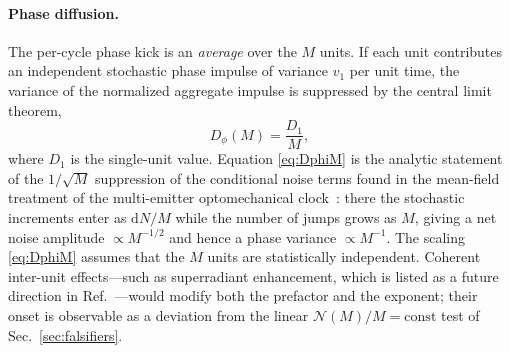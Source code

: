 \documentclass[aps,pre,reprint,amsmath,amssymb,floatfix,nofootinbib]{revtex4-2}
\newcommand{\Dphi}{D_{\phi}}
\begin{document}
\paragraph*{Phase diffusion.}
The per-cycle phase kick is an \emph{average} over the $M$ units. If each
unit contributes an independent stochastic phase impulse of variance
$v_1$ per unit time, the variance of the normalized aggregate impulse is
suppressed by the central limit theorem,
\begin{equation}
  \Dphi(M) = \frac{D_1}{M},
  \label{eq:DphiM}
\end{equation}
where $D_1$ is the single-unit value. Equation \eqref{eq:DphiM} is the
analytic statement of the $1/\sqrt{M}$ suppression of the conditional
noise terms found in the mean-field treatment of the multi-emitter
optomechanical clock~\cite{Brunelli2026,Landi2024}: there the stochastic
increments enter as $\mathrm{d}N/M$ while the number of jumps grows as
$M$, giving a net noise amplitude $\propto M^{-1/2}$ and hence a phase
variance $\propto M^{-1}$.
The scaling \eqref{eq:DphiM} assumes that the $M$ units are
statistically independent. Coherent inter-unit effects---such as
superradiant enhancement, which is listed as a future direction in
Ref.~\cite{Brunelli2026}---would modify both the prefactor and the
exponent; their onset is observable as a deviation from the linear
$\mathcal{N}(M)/M = \mathrm{const}$ test of Sec.~\ref{sec:falsifiers}.
\end{document}
